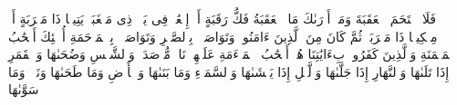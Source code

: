 \startbuffer[\q:90:11]
فَلَا ٱقۡتَحَمَ ٱلۡعَقَبَةَ%
\stopbuffer%
\startbuffer[\q:90:12]
وَمَاۤ أَدۡرَىٰكَ مَا ٱلۡعَقَبَةُ%
\stopbuffer%
\startbuffer[\q:90:13]
فَكُّ رَقَبَةٍ%
\stopbuffer%
\startbuffer[\q:90:14]
أَوۡ إِطۡعَٰمࣱ فِی یَوۡمࣲ ذِی مَسۡغَبَةࣲ%
\stopbuffer%
\startbuffer[\q:90:15]
یَتِیمࣰا ذَا مَقۡرَبَةٍ%
\stopbuffer%
\startbuffer[\q:90:16]
أَوۡ مِسۡكِینࣰا ذَا مَتۡرَبَةࣲ%
\stopbuffer%
\startbuffer[\q:90:17]
ثُمَّ كَانَ مِنَ ٱلَّذِینَ ءَامَنُوا۟ وَتَوَاصَوۡا۟ بِٱلصَّبۡرِ وَتَوَاصَوۡا۟ بِٱلۡمَرۡحَمَةِ%
\stopbuffer%
\startbuffer[\q:90:18]
أُو۟لَٰۤئِكَ أَصۡحَٰبُ ٱلۡمَیۡمَنَةِ%
\stopbuffer%
\startbuffer[\q:90:19]
وَٱلَّذِینَ كَفَرُوا۟ بِءَایَٰتِنَا هُمۡ أَصۡحَٰبُ ٱلۡمَشۡءَمَةِ%
\stopbuffer%
\startbuffer[\q:90:20]
عَلَیۡهِمۡ نَارࣱ مُّؤۡصَدَةُۢ%
\stopbuffer%
\startbuffer[\q:91:1]
وَٱلشَّمۡسِ وَضُحَىٰهَا%
\stopbuffer%
\startbuffer[\q:91:2]
وَٱلۡقَمَرِ إِذَا تَلَىٰهَا%
\stopbuffer%
\startbuffer[\q:91:3]
وَٱلنَّهَارِ إِذَا جَلَّىٰهَا%
\stopbuffer%
\startbuffer[\q:91:4]
وَٱلَّیۡلِ إِذَا یَغۡشَىٰهَا%
\stopbuffer%
\startbuffer[\q:91:5]
وَٱلسَّمَاۤءِ وَمَا بَنَىٰهَا%
\stopbuffer%
\startbuffer[\q:91:6]
وَٱلۡأَرۡضِ وَمَا طَحَىٰهَا%
\stopbuffer%
\startbuffer[\q:91:7]
وَنَفۡسࣲ وَمَا سَوَّىٰهَا%
\stopbuffer%
